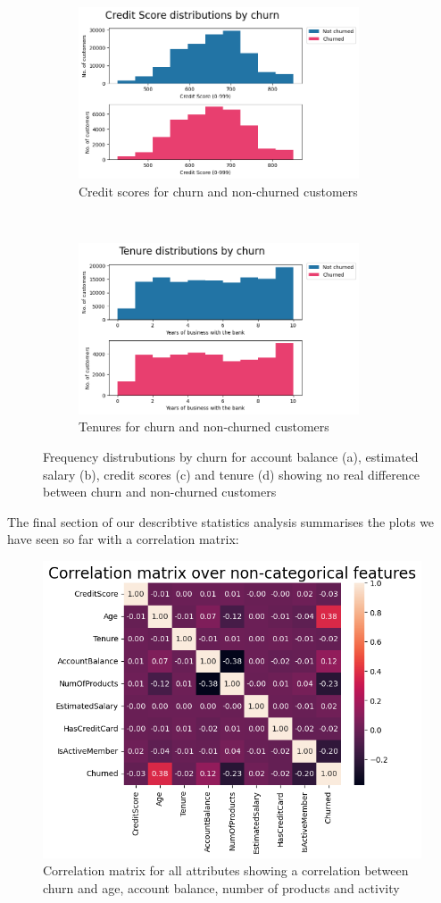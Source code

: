 \documentclass[]{article}
\begin{document}
\begin{figure}[t!]
	\begin{subfigure}[t]{0.55\textwidth}
		\centering
		\includegraphics[height=2in]{credit_score_by_churn}
		\caption{Credit scores for churn and non-churned customers}
	\end{subfigure}%
	~
	\begin{subfigure}[t]{0.5\textwidth}
		\centering
		\includegraphics[height=2in]{tenure_by_churn}
		\caption{Tenures for churn and non-churned customers}
	\end{subfigure}
	\caption{Frequency distrubutions by churn for account balance (a), estimated salary (b), credit scores (c) and tenure (d) showing no real difference between churn and non-churned customers}
\end{figure}

The final section of our describtive statistics analysis summarises the plots we have seen so far with a correlation matrix:

\begin{figure}[h!]
	\centering
	\includegraphics[scale=0.47]{correlation}
	\caption{Correlation matrix for all attributes showing a correlation between churn and age, account balance, number of products and activity}
\end{figure}
\end{document}
